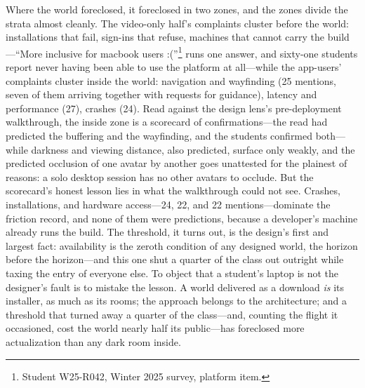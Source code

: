 \documentclass{article}
\begin{document}
Where the world foreclosed, it foreclosed in two zones, and the zones divide the strata almost cleanly. The video-only half's complaints cluster before the world: installations that fail, sign-ins that refuse, machines that cannot carry the build---``More inclusive for macbook users :(''\footnote{Student W25-R042, Winter 2025 survey, platform item.} runs one answer, and sixty-one students report never having been able to use the platform at all---while the app-users' complaints cluster inside the world: navigation and wayfinding (25 mentions, seven of them arriving together with requests for guidance), latency and performance (27), crashes (24). Read against the design lens's pre-deployment walkthrough, the inside zone is a scorecard of confirmations---the read had predicted the buffering and the wayfinding, and the students confirmed both---while darkness and viewing distance, also predicted, surface only weakly, and the predicted occlusion of one avatar by another goes unattested for the plainest of reasons: a solo desktop session has no other avatars to occlude. But the scorecard's honest lesson lies in what the walkthrough could not see. Crashes, installations, and hardware access---24, 22, and 22 mentions---dominate the friction record, and none of them were predictions, because a developer's machine already runs the build. The threshold, it turns out, is the design's first and largest fact: availability is the zeroth condition of any designed world, the horizon before the horizon---and this one shut a quarter of the class out outright while taxing the entry of everyone else. To object that a student's laptop is not the designer's fault is to mistake the lesson. A world delivered as a download \textit{is} its installer, as much as its rooms; the approach belongs to the architecture; and a threshold that turned away a quarter of the class---and, counting the flight it occasioned, cost the world nearly half its public---has foreclosed more actualization than any dark room inside.
\end{document}
